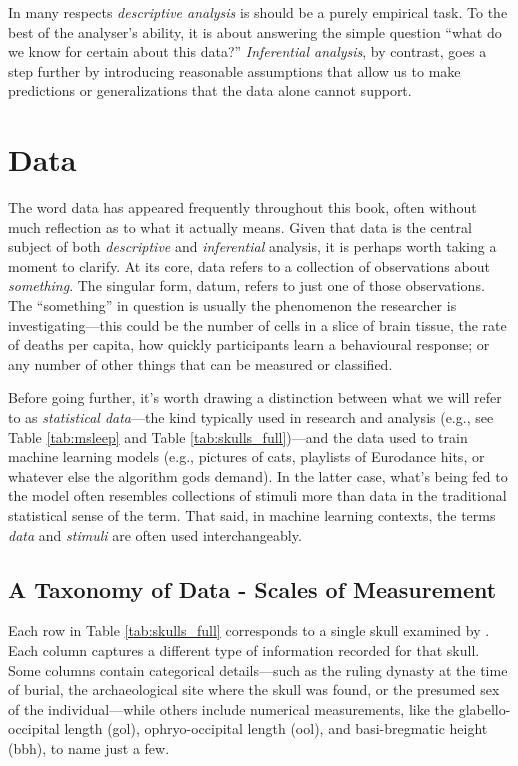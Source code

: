 In many respects \textit{descriptive analysis} is should be a purely empirical task. To the best of the analyser's ability, it is about answering the simple question ``what do we know for certain about this data?''  \textit{Inferential analysis}, by contrast, goes a step further by introducing reasonable assumptions that allow us to make predictions or generalizations that the data alone cannot support.

\section{Data}

The word data has appeared frequently throughout this book, often without much reflection as to what it actually means. Given that data is the central subject of both \textit{descriptive} and \textit{inferential} analysis, it is perhaps worth taking a moment to clarify. At its core, \gls{data} refers to a collection of observations about \textit{something}. The singular form, \gls{datum}, refers to just one of those observations. The ``something'' in question is usually the phenomenon the researcher is investigating—this could be the number of cells in a slice of brain tissue, the rate of deaths per capita, how quickly participants learn a behavioural response; or any number of other things that can be measured or classified. 

Before going further, it’s worth drawing a distinction between what we will refer to as \textit{statistical data}—the kind typically used in research and analysis (e.g., see Table \ref{tab:msleep} and Table \ref{tab:skulls_full})—and the data used to train machine learning models (e.g., pictures of cats, playlists of Eurodance hits, or whatever else the algorithm gods demand). In the latter case, what’s being fed to the model often resembles collections of stimuli more than data in the traditional statistical sense of the term. That said, in machine learning contexts, the terms \textit{data} and \textit{stimuli} are often used interchangeably.

\subsection{A Taxonomy of Data - Scales of Measurement}

Each row in Table \ref{tab:skulls_full} corresponds to a single skull examined by \textcite{Thomson1905}. Each column captures a different type of information recorded for that skull. Some columns contain categorical details—such as the ruling dynasty at the time of burial, the archaeological site where the skull was found, or the presumed sex of the individual—while others include numerical measurements, like the glabello-occipital length (gol), ophryo-occipital length (ool), and basi-bregmatic height (bbh), to name just a few.

